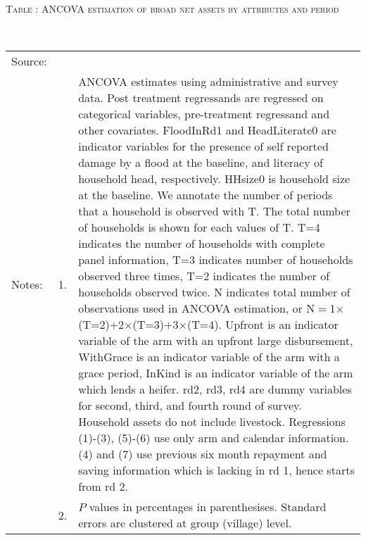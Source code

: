 \hspace{-1cm}\begin{minipage}[t]{14cm}
\hfil\textsc{\normalsize Table \thetable: ANCOVA estimation of broad net assets by attributes and period\label{tab ANCOVA net assets timevarying attributes}}\\
\setlength{\tabcolsep}{1pt}
\setlength{\baselineskip}{8pt}
\renewcommand{\arraystretch}{.55}
\hfil{}\\
\renewcommand{\arraystretch}{.8}
\setlength{\tabcolsep}{1pt}
\begin{tabular}{>{\hfill\scriptsize}p{1cm}<{}>{\hfill\scriptsize}p{.25cm}<{}>{\scriptsize}p{12cm}<{\hfill}}
Source:& \multicolumn{2}{l}{\scriptsize Estimated with GUK administrative and survey data.}\\
Notes: & 1. & ANCOVA estimates using administrative and survey data. Post treatment regressands are regressed on categorical variables, pre-treatment regressand and other covariates. \textsf{FloodInRd1} and \textsf{HeadLiterate0} are indicator variables for the presence of self reported damage by a flood at the baseline, and literacy of household head, respectively. \textsf{HHsize0} is household size at the baseline. We annotate the number of periods that a household is observed with \textsf{T}. The total number of households is shown for each values of \textsf{T}. \textsf{T=4} indicates the number of households with complete panel information, \textsf{T=3} indicates number of households observed three times, \textsf{T=2} indicates the number of households observed twice. \textsf{N} indicates total number of observations used in ANCOVA estimation, or \textsf{N$=$1$\times$(T=2)+2$\times$(T=3)+3$\times$(T=4)}.  \textsf{Upfront} is an indicator variable of the arm with an upfront large disbursement, \textsf{WithGrace} is an indicator variable of the arm with a grace period, \textsf{InKind} is an indicator variable of the arm which lends a heifer. \textsf{rd2, rd3, rd4} are dummy variables for second, third, and fourth round of survey. Household assets do not include livestock. Regressions (1)-(3), (5)-(6) use only arm and calendar information. (4) and (7) use previous six month repayment and saving information which is lacking in rd 1, hence starts from rd 2.\\
& 2. & $P$ values in percentages in parenthesises. Standard errors are clustered at group (village) level.
\end{tabular}
\end{minipage}


